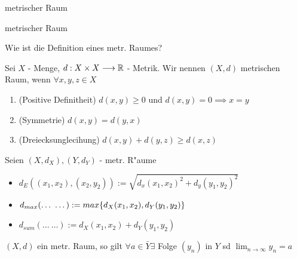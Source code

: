 \documentclass[class=article, crop=false]{standalone}
\begin{document}
\begin{zettel}{metrischer Raum}
\begin{flashcard}[jngbc861]{metrischer Raum}
	\begin{question}
		Wie ist die Definition eines metr. Raumes?
	\end{question}
	\begin{definition}
		Sei $X$ - Menge, $d:X \times X \longrightarrow \mathbb{R}$ - Metrik. Wir nennen $(X,d)$ metrischen Raum, wenn $\forall x,y,z \in X$
		\begin{enumerate}
			\item (Positive Definitheit) $d(x,y) \geq 0$ und $d(x,y)= 0 \implies x = y$
			\item (Symmetrie) $d(x,y) = d(y,x)$
			\item (Dreiecksunglecihung) $d(x,y) + d(y,z) \geq d(x,z)$
		\end{enumerate}
	\end{definition}
\end{flashcard}

\begin{example}[Metriken]
	Seien $ (X,d_X) , (Y,d_Y)  $ - metr. R"aume
	\begin{itemize}
		\item $d_E ( (x_1,x_2) , (x_2,y_2)) := \sqrt{d_x (x_1,x_2)^2 + d_y (y_1,y_2)^2  }$
		\item $d_{max} (\dots\ \dots) := max \set{ d_X (x_1,x_2) , d_Y  (y_1,y_2) }$
		\item $d_{sum} (\dots\ \dots):= d_X (x_1,x_2) +  d_Y (y_1,y_2) $
	\end{itemize}
\end{example}

\begin{theorem}
	$(X,d)$ ein metr. Raum, so gilt $\forall a \in  \bar{Y} \exists $ Folge $(y_n )$ in $Y$ sd $\lim_{n \to \infty} y_n = a$
\end{theorem}

\end{zettel}
\end{document}
